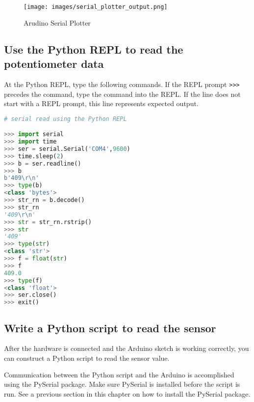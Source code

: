 \documentclass{book}
\makeatletter
\def\maxwidth{\ifdim\Gin@nat@width>\linewidth\linewidth
\else\Gin@nat@width\fi}
\let\Oldincludegraphics\includegraphics
\renewcommand{\includegraphics}[1]{\Oldincludegraphics[width=.8\maxwidth]{#1}}
\newcommand{\passthrough}[1]{#1}
\makeatother
\begin{document}
\begin{figure}
\centering
\texttt{[image: images/serial\_plotter\_output.png]}
\caption{Arudino Serial Plotter}
\end{figure}
    




    
        \hypertarget{use-the-python-repl-to-read-the-potentiometer-data}{%
\subsection{Use the Python REPL to read the potentiometer
data}\label{use-the-python-repl-to-read-the-potentiometer-data}}

At the Python REPL, type the following commands. If the REPL prompt
\passthrough{\lstinline!>>>!} precedes the command, type the command
into the REPL. If the line does not start with a REPL prompt, this line
represents expected output.

\begin{lstlisting}[language=Python]
# serial read using the Python REPL

>>> import serial
>>> import time
>>> ser = serial.Serial('COM4',9600)
>>> time.sleep(2)
>>> b = ser.readline()
>>> b
b'409\r\n'
>>> type(b)
<class 'bytes'>
>>> str_rn = b.decode()
>>> str_rn
'409\r\n'
>>> str = str_rn.rstrip()
>>> str
'409'
>>> type(str)
<class 'str'>
>>> f = float(str)
>>> f
409.0
>>> type(f)
<class 'float'>
>>> ser.close()
>>> exit()
\end{lstlisting}
    




    
        \hypertarget{write-a-python-script-to-read-the-sensor}{%
\subsection{Write a Python script to read the
sensor}\label{write-a-python-script-to-read-the-sensor}}
    




    
        After the hardware is connected and the Arduino sketch is working
correctly, you can construct a Python script to read the sensor value.

Communication between the Python script and the Arduino is accomplished
using the PySerial package. Make sure PySerial is installed before the
script is run. See a previous section in this chapter on how to install
the PySerial package.
\end{document}

